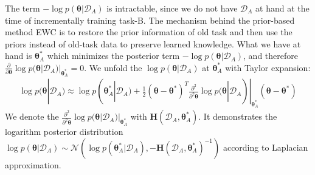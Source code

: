 \documentclass{article}
\begin{document}
The term $-\log p(\boldsymbol{\theta} | \mathcal D_A)$
is intractable, since we do not have $\mathcal D_A$ at hand at the time of incrementally training task-B.
The mechanism behind the prior-based method EWC is to restore the prior information
of old task and then use the priors instead of old-task data to preserve learned knowledge.
What we have at hand is $\boldsymbol{\theta}_A^*$ which minimizes the posterior term
$-\log p(\boldsymbol{\theta} | \mathcal D_A)$, and therefore
$\frac{\partial}{\partial \boldsymbol{\theta}} \log p(\boldsymbol{\theta} | \mathcal D_A)|_{\boldsymbol{\theta}_A^*} = 0$.
We unfold the $\log p(\boldsymbol{\theta} | \mathcal D_A)$ at $\boldsymbol{\theta}_A^*$
with Taylor expansion:
\begin{equation}
\begin{split}
\log p(\boldsymbol{\theta} | \mathcal D_A)
\approx \log p(\boldsymbol{\theta}_A^*|\mathcal D_A)
+ \frac{1}{2}(\boldsymbol{\theta} - \boldsymbol{\theta}^*)^T
\frac{\partial^2}{\partial^2 \boldsymbol{\theta}}
\log p(\boldsymbol{\theta} | \mathcal D_A)|_{\boldsymbol{\theta}_A^*}
(\boldsymbol{\theta} - \boldsymbol{\theta}^*)
\label{eq:posterior_task-A}
\end{split}
\end{equation}
We denote the $\frac{\partial^2}{\partial^2 \boldsymbol{\theta}}
\log p(\boldsymbol{\theta} | \mathcal D_A)|_{\boldsymbol{\theta}_A^*}$
with $\boldsymbol{H}(\mathcal D_A, \boldsymbol{\theta}_A^*)$.
It demonstrates the logarithm posterior distribution
$\log p(\boldsymbol{\theta}|\mathcal D_A) \sim \mathcal 
N(\log p(\boldsymbol{\theta}_A^*|\mathcal D_A),
-\boldsymbol{H}(\mathcal D_A, \boldsymbol{\theta}_A^*)^{-1})$
according to Laplacian approximation.
\end{document}
